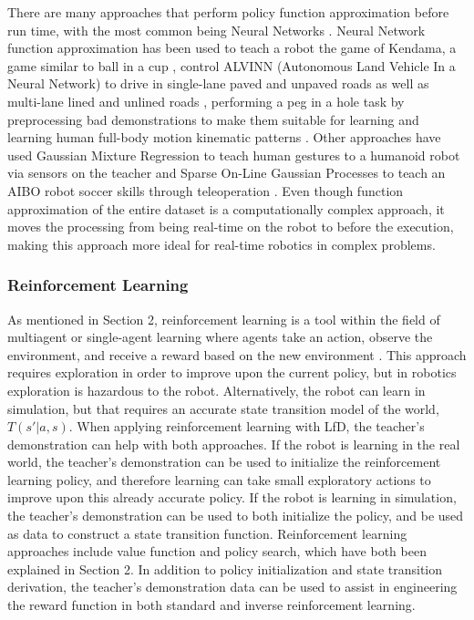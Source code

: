 \documentclass{article}
\begin{document}
There are many approaches that perform policy function approximation before run time, with the most common being Neural Networks \cite{A_programmingfull-body, Dillmann95acquisitionof, journals/nn/MiyamotoSGGKONWK96, Pomerleau:1991:ETA:1351011.1351019}.  Neural Network function approximation has been used to teach a robot the game of Kendama, a game similar to ball in a cup \cite{journals/nn/MiyamotoSGGKONWK96}, control ALVINN (Autonomous Land Vehicle In a Neural Network) to drive in single-lane paved and unpaved roads as well as multi-lane lined and unlined roads \cite{Pomerleau:1991:ETA:1351011.1351019}, performing a peg in a hole task by preprocessing bad demonstrations to make them suitable for learning \cite{Dillmann95acquisitionof} and learning human full-body motion kinematic patterns \cite{A_programmingfull-body}. Other approaches have used Gaussian Mixture Regression to teach human gestures to a humanoid robot via sensors on the teacher \cite{6251697} and Sparse On-Line Gaussian Processes to teach an AIBO robot soccer skills through teleoperation \cite{4543716}. Even though function approximation of the entire dataset is a computationally complex approach, it moves the processing from being real-time on the robot to before the execution, making this approach more ideal for real-time robotics in complex problems. 


\subsubsection{Reinforcement Learning} \label{sec:PD:Reinforcement Learning}
As mentioned in Section 2, reinforcement learning is a tool within the field of multiagent or single-agent learning where agents take an action, observe the environment, and receive a reward based on the new environment \cite{Sutton98reinforcementlearning}. This approach requires exploration in order to improve upon the current policy, but in robotics exploration is hazardous to the robot. Alternatively, the robot can learn in simulation, but that requires an accurate state transition model of the world, $T(s'|a,s)$. When applying reinforcement learning with LfD, the teacher's demonstration can help with both approaches. If the robot is learning in the real world, the teacher's demonstration can be used to initialize the reinforcement learning policy, and therefore learning can take small exploratory actions to improve upon this already accurate policy. If the robot is learning in simulation, the teacher's demonstration can be used to both initialize the policy, and be used as data to construct a state transition function. Reinforcement learning approaches include value function and policy search, which have both been explained in Section 2. In addition to policy initialization and state transition derivation, the teacher's demonstration data can be used to assist in engineering the reward function in both standard and inverse reinforcement learning.
\end{document}
